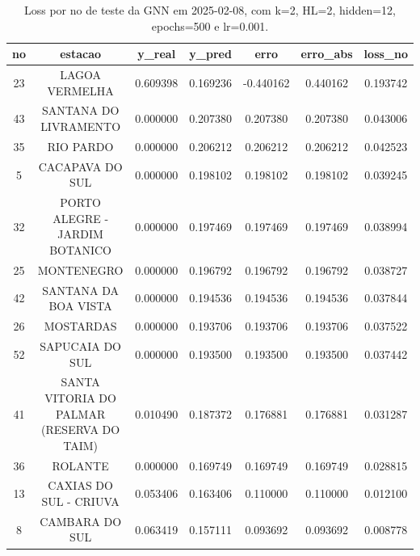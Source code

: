 \begin{table}[h]
\centering
\caption{Loss por no de teste da GNN em 2025-02-08, com k=2, HL=2, hidden=12, epochs=500 e lr=0.001.}
\label{tab:gnn_loss_k2_hl2_h12_e500_d20250208}
\begin{tabular}{ccccccc}
\toprule
no & estacao & y\_real & y\_pred & erro & erro\_abs & loss\_no \\
\midrule
23 & LAGOA VERMELHA & 0.609398 & 0.169236 & -0.440162 & 0.440162 & 0.193742 \\
43 & SANTANA DO LIVRAMENTO & 0.000000 & 0.207380 & 0.207380 & 0.207380 & 0.043006 \\
35 & RIO PARDO & 0.000000 & 0.206212 & 0.206212 & 0.206212 & 0.042523 \\
5 & CACAPAVA DO SUL & 0.000000 & 0.198102 & 0.198102 & 0.198102 & 0.039245 \\
32 & PORTO ALEGRE - JARDIM BOTANICO & 0.000000 & 0.197469 & 0.197469 & 0.197469 & 0.038994 \\
25 & MONTENEGRO & 0.000000 & 0.196792 & 0.196792 & 0.196792 & 0.038727 \\
42 & SANTANA DA BOA VISTA & 0.000000 & 0.194536 & 0.194536 & 0.194536 & 0.037844 \\
26 & MOSTARDAS & 0.000000 & 0.193706 & 0.193706 & 0.193706 & 0.037522 \\
52 & SAPUCAIA DO SUL & 0.000000 & 0.193500 & 0.193500 & 0.193500 & 0.037442 \\
41 & SANTA VITORIA DO PALMAR (RESERVA DO TAIM) & 0.010490 & 0.187372 & 0.176881 & 0.176881 & 0.031287 \\
36 & ROLANTE & 0.000000 & 0.169749 & 0.169749 & 0.169749 & 0.028815 \\
13 & CAXIAS DO SUL - CRIUVA & 0.053406 & 0.163406 & 0.110000 & 0.110000 & 0.012100 \\
8 & CAMBARA DO SUL & 0.063419 & 0.157111 & 0.093692 & 0.093692 & 0.008778 \\
\bottomrule
\end{tabular}
\end{table}
